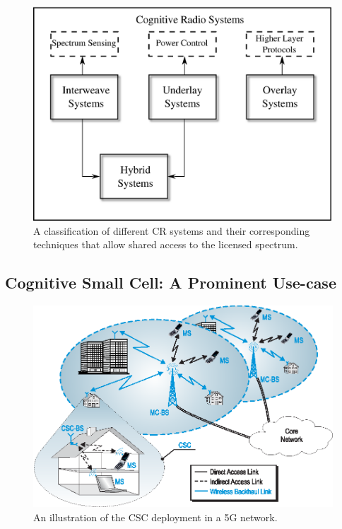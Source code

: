 \begin{figure}
\centering
\includegraphics[width = 0.85 \columnwidth]{figures/CR_paradigm}
\caption{A classification of different CR systems and their corresponding techniques that allow shared access to the licensed spectrum.}
\label{fig_Int:paradigm}
\end{figure}



\subsection{Cognitive Small Cell: A Prominent Use-case}
\begin{figure}
\centering
\includegraphics[width = 0.9 \columnwidth]{figures/Cellular_Scenario_CR6F}
\caption{An illustration of the CSC deployment in a 5G network.}
\label{fig_Int:archi}
\end{figure}



